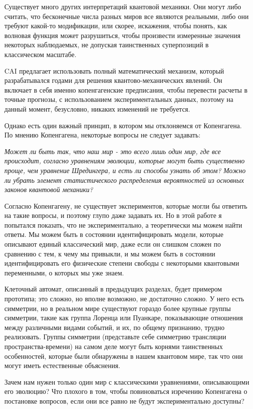 \documentclass[main.tex]{subfiles}
\begin{document}
Существует много других интерпретаций квантовой механики. Они могут либо считать, что бесконечные числа разных миров все являются реальными, либо они требуют какой-то модификации, или скорее, искажения, чтобы понять, как волновая функция может разрушиться, чтобы произвести измеренные значения некоторых наблюдаемых, не допуская таинственных суперпозиций в классическом масштабе.

CAI предлагает использовать полный математический механизм, который разрабатывался годами для решения квантово-механических явлений. Он включает в себя именно копенгагенские предписания, чтобы перевести расчеты в точные прогнозы, с использованием экспериментальных данных, поэтому на данный момент, безусловно, никаких изменений не требуется.

Однако есть один важный принцип, в котором мы отклоняемся от Копенгагена. По мнению Копенгагена, некоторые вопросы не следует задавать:

\textit{Может ли быть так, что наш мир - это всего лишь один мир, где все происходит, согласно уравнениям эволюции, которые могут быть существенно проще, чем уравнение Шредингера, и есть ли способы узнать об этом? Можно ли убрать элемент статистического распределения вероятностей из основных законов квантовой механики?}

Согласно Копенгагену, не существует экспериментов, которые могли бы ответить на такие вопросы, и поэтому глупо даже задавать их. Но в этой работе я попытался показать, что не экспериментально, а теоретически мы можем найти ответы. Мы можем быть в состоянии идентифицировать модели, которые описывают единый классический мир, даже если он слишком сложен по сравнению с тем, к чему мы привыкли, и мы можем быть в состоянии идентифицировать его физические степени свободы с некоторыми квантовыми переменными, о которых мы уже знаем.

Клеточный автомат, описанный в предыдущих разделах, будет примером прототипа; это сложно, но вполне возможно, не достаточно сложно. У него есть симметрии, но в реальном мире существуют гораздо более крупные группы симметрии, такие как группа Лоренца или Пуанкаре, показывающие отношения между различными видами событий, и их, по общему признанию, трудно реализовать. Группы симметрии (представьте себе симметрию трансляции пространства-времени) на самом деле могут быть корнями таинственных особенностей, которые были обнаружены в нашем квантовом мире, так что они могут иметь естественные объяснения.

Зачем нам нужен только один мир с классическими уравнениями, описывающими его эволюцию? Что плохого в том, чтобы повиноваться изречению Копенгагена о постановке вопросов, если они все равно не будут экспериментально доступны?
\end{document}
